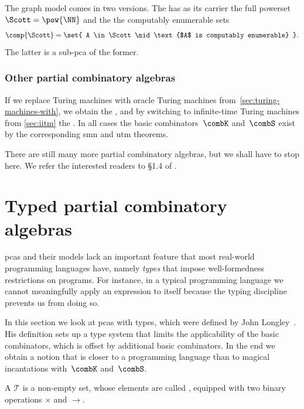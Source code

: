 The graph model comes in two versions. The  has as its carrier the full powerset $\Scott = \pow{\NN}$ and the  the computably enumerable sets
%
\begin{equation*}
  \comp{\Scott} = \set{ A \in \Scott \mid \text{$A$ is computably enumerable} }.
\end{equation*}
%
The latter is a sub-pca of the former.

\subsubsection{Other partial combinatory algebras}
\label{sec:other-pcas}

If we replace Turing machines with oracle Turing machines from~\cref{sec:turing-machines-with}, we obtain the , and by switching to infinite-time Turing machines from \cref{sec:iitm} the . In all cases the basic combinators~$\combK$ and~$\combS$ exist by the corresponding smn and utm theorems.

There are still many more partial combinatory algebras, but we shall have to stop here. We refer the interested readers to \S1.4 of .




\section{Typed partial combinatory algebras}
\label{sec:tpcas}

pcas and their models lack an important feature that most
real-world programming languages have, namely \emph{types} that impose
well-formedness restrictions on programs. For instance, in a typical programming language we cannot meaningfully apply an  expression to itself because the typing discipline prevents us from doing so.

In this section we look at pcas with types, which were defined by John
Longley~.
His definition sets up a type system that limits the applicability of the basic combinators, which is offset by additional basic combinators. In the end we obtain a notion that is closer to a programming language than to magical incantations with~$\combK$ and~$\combS$.

\begin{definition}
  A  $\mathcal{T}$ is a non-empty set, whose elements
  are called , equipped with two binary operations $\times$
  and $\to$.
\end{definition}

